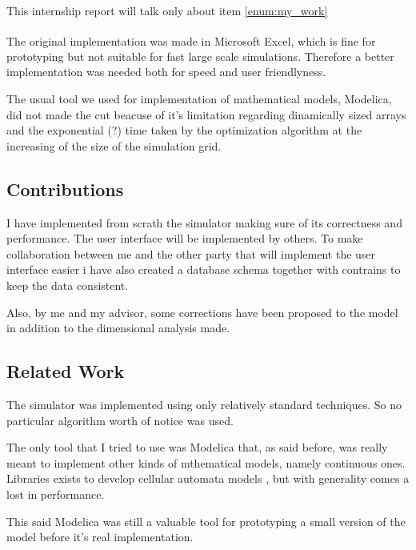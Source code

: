 \documentclass{article}
\begin{document}
This internship report will talk only about item \ref{enum:my_work}

The original implementation was made in Microsoft
Excel\textsuperscript{\textregistered}, which is fine for prototyping but not
suitable for fast large scale simulations. Therefore a better implementation was
needed both for speed and user friendlyness.

The usual tool we used for implementation of mathematical models, Modelica, did
not made the cut beacuse of it's limitation regarding dinamically sized arrays
and the exponential (?) time taken by the optimization algorithm at the
increasing of the size of the simulation grid.

\subsection{Contributions}\label{sec:contrib}

I have implemented from scrath the simulator making sure of its correctness and
performance. The user interface will be implemented by others. To make
collaboration between me and the other party that will implement the user
interface easier i have also created a database schema together with contrains
to keep the data consistent.

Also, by me and my advisor, some corrections have been proposed to the model in
addition to the dimensional analysis made.

\subsection{Related Work}\label{sec:related_work}

The simulator was implemented using only relatively standard techniques. So no
particular algorithm worth of notice was used.

The only tool that I tried to use was Modelica that, as said before, was really
meant to implement other kinds of mthematical models, namely continuous ones.
Libraries exists to develop cellular automata models \cite{calib2}, but with
generality comes a lost in performance.

This said Modelica was still a valuable tool for prototyping a small version of
the model before it's real implementation.
\end{document}
